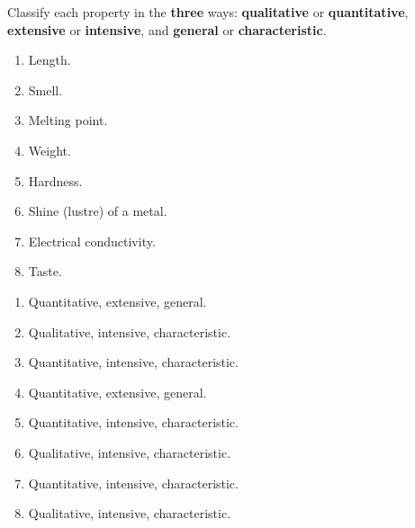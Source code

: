 \begin{exercise}
    Classify each property in the \textbf{three} ways: \textbf{qualitative} or \textbf{quantitative}, \textbf{extensive} or \textbf{intensive}, and \textbf{general} or \textbf{characteristic}.
    \begin{enumerate}[label=\letraminuscula]
        \item Length.
        \item Smell.
        \item Melting point.
        \item Weight.
        \item Hardness.
        \item Shine (lustre) of a metal.
        \item Electrical conductivity.
        \item Taste.
    \end{enumerate}
    \begin{solu}
        \begin{enumerate}[label=\alph*)]
            \item Quantitative, extensive, general.
            \item Qualitative, intensive, characteristic.
            \item Quantitative, intensive, characteristic.
            \item Quantitative, extensive, general.
            \item Quantitative, intensive, characteristic.
            \item Qualitative, intensive, characteristic.
            \item Quantitative, intensive, characteristic.
            \item Qualitative, intensive, characteristic.
        \end{enumerate}
    \end{solu}
\end{exercise}

